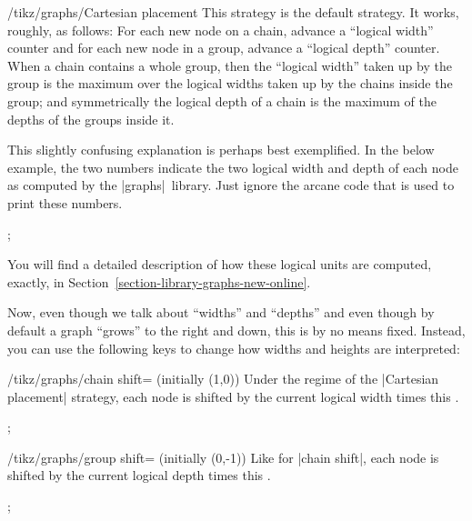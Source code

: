 \begin{key}{/tikz/graphs/Cartesian placement}
    This strategy is the default strategy. It works, roughly, as follows: For
    each new node on a chain, advance a ``logical width'' counter and for each
    new node in a group, advance a ``logical depth'' counter. When a chain
    contains a whole group, then the ``logical width'' taken up by the group is
    the maximum over the logical widths taken up by the chains inside the
    group; and symmetrically the logical depth of a chain is the maximum of the
    depths of the groups inside it.

    This slightly confusing explanation is perhaps best exemplified. In the
    below example, the two numbers indicate the two logical width and depth of
    each node as computed by the |graphs| library. Just ignore the arcane code
    that is used to print these numbers.
\begin{codeexample}[preamble={\usetikzlibrary{graphs}}]
\tikz
  ;
\end{codeexample}
    You will find a detailed description of how these logical units are
    computed, exactly, in Section~\ref{section-library-graphs-new-online}.

    Now, even though we talk about ``widths'' and ``depths'' and even though by
    default a graph ``grows'' to the right and down, this is by no means fixed.
    Instead, you can use the following keys to change how widths and heights
    are interpreted:
    \begin{key}{/tikz/graphs/chain shift= (initially {(1,0)})}
        Under the regime of the |Cartesian placement| strategy, each node is
        shifted by the current logical width times this .
\begin{codeexample}[preamble={\usetikzlibrary{graphs}}]
\tikz {};
\end{codeexample}
    \end{key}
    \begin{key}{/tikz/graphs/group shift= (initially {(0,-1)})}
        Like for |chain shift|, each node is shifted by the current logical
        depth times this .
\begin{codeexample}[preamble={\usetikzlibrary{graphs}}]
\tikz {};
\end{codeexample}
    \end{key}
\end{key}

